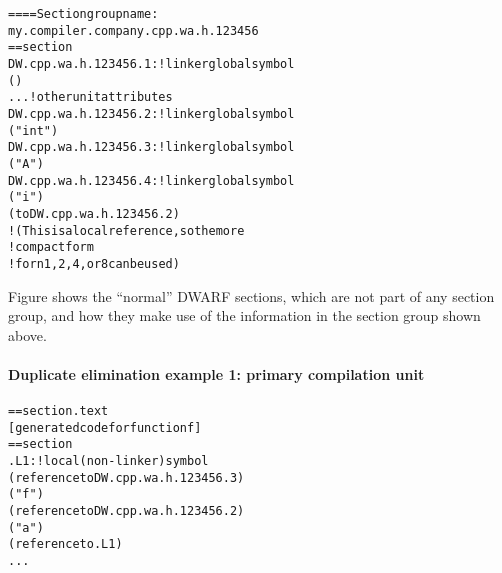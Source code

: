 \label{app:duplicateeliminationexample1dwarfsectiongroup}
\begin{alltt}
==== Section group name:
    my.compiler.company.cpp.wa.h.123456
== section 
DW.cpp.wa.h.123456.1: ! linker global symbol
        ()
        ...  ! other unit attributes
DW.cpp.wa.h.123456.2: ! linker global symbol
        ("int")
DW.cpp.wa.h.123456.3: ! linker global symbol
        ("A")
DW.cpp.wa.h.123456.4: ! linker global symbol
        ("i")
        ( to DW.cpp.wa.h.123456.2)
            ! (This is a local reference, so the more
            ! compact form  
            ! for n 1,2,4, or 8 can be used)
\end{alltt}


Figure 
shows the ``normal'' DWARF sections, which are not part of
any section group, and how they make use of the information
in the section group shown above.

\paragraph{Duplicate elimination example 1: primary compilation unit} 
\label{app:duplicateeliminationexample1primarycompilationunit}
\begin{alltt}
== section .text
    [generated code for function f]
== section 
.L1:                   ! local (non-linker) symbol
            (reference to DW.cpp.wa.h.123456.3)
            ("f")
            (reference to DW.cpp.wa.h.123456.2)
                ("a")
                (reference to .L1)
        ...
\end{alltt}

